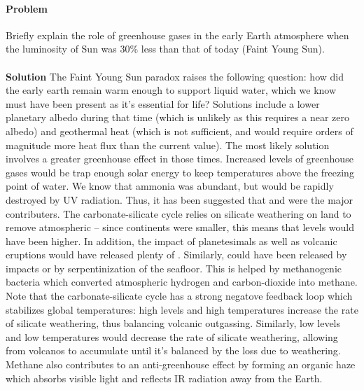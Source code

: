 \documentclass[10pt]{article}
\newcounter{prob}
\def\problem{\stepcounter{prob}\paragraph{Problem \arabic{prob}}}
\def\solution{\\\\\textbf{Solution }}
\begin{document}
        \problem Briefly explain the role of greenhouse gases in the early Earth atmosphere when the luminosity of Sun was 30\% less than that
        of today (Faint Young Sun).
        \solution The Faint Young Sun paradox raises the following question: how did the early earth remain warm enough to support liquid water,
        which we know must have been present as it's essential for life? Solutions include a lower planetary albedo during that time (which is
        unlikely as this requires a near zero albedo) and geothermal heat (which is not sufficient, and would require orders of magnitude more
        heat flux than the current value). The most likely solution involves a greater greenhouse effect in those times. Increased
        levels of greenhouse gases would be trap enough solar energy to keep temperatures above the freezing point of water. We know that ammonia was 
        abundant, but would be rapidly destroyed by UV radiation. Thus, it has been suggested that  and  were the major
        contributers. The carbonate-silicate cycle relies on silicate weathering on land to remove atmospheric  --
        since continents were smaller, this means that  levels would have been higher. In addition, the impact of planetesimals
        as well as volcanic eruptions would have released plenty of . Similarly,  could have been released by impacts
        or by serpentinization of the seafloor. This is helped by methanogenic bacteria which converted atmospheric hydrogen and
        carbon-dioxide into methane. \\

        Note that the carbonate-silicate cycle has a strong negatove feedback loop which stabilizes global temperatures: high  levels
        and high temperatures increase the rate of silicate weathering, thus balancing volcanic outgassing. Similarly,
        low  levels and low temperatures would decrease the rate of silicate weathering, allowing  from volcanos to 
        accumulate until it's balanced by the loss due to weathering.
        Methane also contributes to an anti-greenhouse effect by forming an organic haze which absorbs visible light and reflects
        IR radiation away from the Earth.
\end{document}

